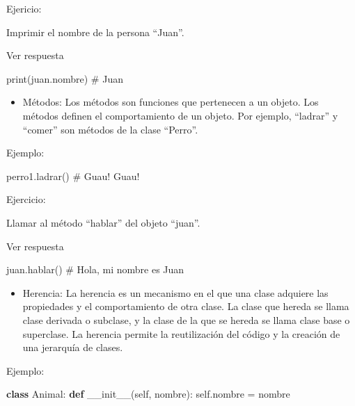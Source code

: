 \documentclass[
  a4paper,
  DIV=11,
  numbers=noendperiod,
  onepage,
  openany]{scrreprt}
\newenvironment{Shaded}{\begin{snugshade}}{\end{snugshade}}
\newcommand{\BuiltInTok}[1]{\textcolor[rgb]{0.00,0.23,0.31}{#1}}
\newcommand{\CommentTok}[1]{\textcolor[rgb]{0.37,0.37,0.37}{#1}}
\newcommand{\FunctionTok}[1]{\textcolor[rgb]{0.28,0.35,0.67}{#1}}
\newcommand{\KeywordTok}[1]{\textcolor[rgb]{0.00,0.23,0.31}{\textbf{#1}}}
\newcommand{\NormalTok}[1]{\textcolor[rgb]{0.00,0.23,0.31}{#1}}
\newcommand{\OperatorTok}[1]{\textcolor[rgb]{0.37,0.37,0.37}{#1}}
\newcommand{\VariableTok}[1]{\textcolor[rgb]{0.07,0.07,0.07}{#1}}
\providecommand{\tightlist}{%
  \setlength{\itemsep}{0pt}\setlength{\parskip}{0pt}}\usepackage{longtable,booktabs,array}
\begin{document}
\begin{tcolorbox}
Ejericio:

Imprimir el nombre de la persona ``Juan''.

Ver respuesta

\begin{Shaded}
\begin{Highlighting}[]
\BuiltInTok{print}\NormalTok{(juan.nombre)  }\CommentTok{\# Juan}
\end{Highlighting}
\end{Shaded}

\begin{itemize}
\tightlist
\item
  Métodos: Los métodos son funciones que pertenecen a un objeto. Los
  métodos definen el comportamiento de un objeto. Por ejemplo,
  ``ladrar'' y ``comer'' son métodos de la clase ``Perro''.
\end{itemize}

Ejemplo:

\begin{Shaded}
\begin{Highlighting}[]
\NormalTok{perro1.ladrar()  }\CommentTok{\# Guau! Guau!}
\end{Highlighting}
\end{Shaded}

Ejercicio:

Llamar al método ``hablar'' del objeto ``juan''.

Ver respuesta

\begin{Shaded}
\begin{Highlighting}[]
\NormalTok{juan.hablar()  }\CommentTok{\# Hola, mi nombre es Juan}
\end{Highlighting}
\end{Shaded}

\begin{itemize}
\tightlist
\item
  Herencia: La herencia es un mecanismo en el que una clase adquiere las
  propiedades y el comportamiento de otra clase. La clase que hereda se
  llama clase derivada o subclase, y la clase de la que se hereda se
  llama clase base o superclase. La herencia permite la reutilización
  del código y la creación de una jerarquía de clases.
\end{itemize}

Ejemplo:

\begin{Shaded}
\begin{Highlighting}[]
\KeywordTok{class}\NormalTok{ Animal:}
    \KeywordTok{def} \FunctionTok{\_\_init\_\_}\NormalTok{(}\VariableTok{self}\NormalTok{, nombre):}
        \VariableTok{self}\NormalTok{.nombre }\OperatorTok{=}\NormalTok{ nombre}


\end{Highlighting}
\end{Shaded}
\end{tcolorbox}
\end{document}
